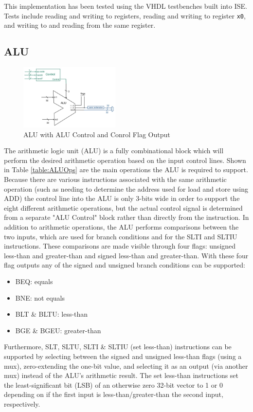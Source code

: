 \documentclass[lettersize,journal]{IEEEtran}
\begin{document}
This implementation has been tested using the VHDL testbenches built into ISE.
Tests include reading and writing to registers, reading and writing to register \verb|x0|, and writing to and reading from the same register.


\subsection{ALU}
\begin{figure}[!h]
    \label{fig:alublock}
    \centering
    \includegraphics[width=5cm]{CPTR380_ALU.png}
    \caption{ALU with ALU Control and Conrol Flag Output}
\end{figure}
The arithmetic logic unit (ALU) is a fully combinational block which will perform the desired arithmetic operation based on the input control lines.
Shown in Table \ref{table:ALUOps} are the main operations the ALU is required to support. Because there are various instructions associated with the same
arithmetic operation (such as needing to determine the address used for load and store using ADD) the control line into the ALU is only 3-bits wide in order to support
the eight different arithmetic operations, but the actual control signal is determined from a separate "ALU Control" block rather than directly from the instruction.
In addition to arithmetic operations, the ALU performs comparisons between the two inputs, which are used for branch conditions and for the SLTI and SLTIU instructions.
These comparisons are made visible through four flags: unsigned less-than and greater-than and signed less-than and greater-than.
With these four flag outputs any of the signed and unsigned branch conditions can be supported:
\begin{itemize}
    \item BEQ: equals
    \item BNE: not equals
    \item BLT \& BLTU: less-than
    \item BGE \& BGEU: greater-than
\end{itemize}
Furthermore, SLT, SLTU, SLTI \& SLTIU (set less-than) instructions can be supported by selecting between the signed and unsigned less-than flags (using a mux), zero-extending the one-bit value, and selecting it as an output (via another mux) instead of the ALU's arithmetic result.
The set less-than instructions set the least-significant bit (LSB) of an otherwise zero 32-bit vector to 1 or 0 depending on if the first input is less-than/greater-than the second input, respectively.
\end{document}
